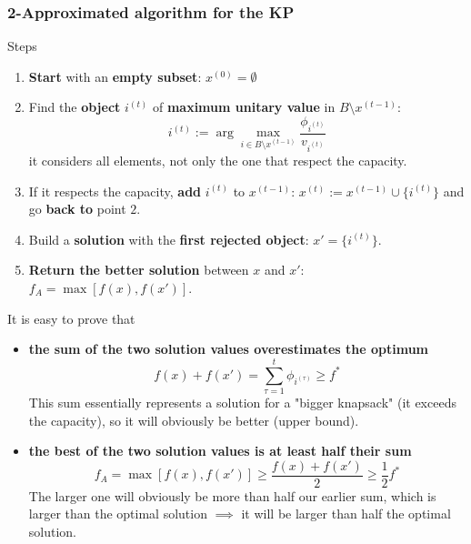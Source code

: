 \subsubsection{2-Approximated algorithm for the KP}
Steps
\begin{enumerate}
	\item \textbf{Start} with an \textbf{empty subset}: $x^{(0)} = \emptyset$
	
	\item Find the \textbf{object} $i^{(t)}$ of \textbf{maximum unitary value} in $B \setminus x^{(t−1)}$:
	$$ i^{(t)} := \arg \max_{i \in B \setminus x^{(t-1)}} \frac{\phi_{i^{(t)}}}{v_{i^{(t)}}}$$
	it considers all elements, not only the one that respect the capacity.\\
	
	\item If it respects the capacity, \textbf{add} $i^{(t)}$ to $x^{(t−1)}$: $x^{(t)} := x^{(t−1)} \cup \{i^{(t)}\}$ and go \textbf{back to} point $2$.\\
	
	\item Build a \textbf{solution} with the \textbf{first rejected object}: $x' = \{i^{(t)}\}$.\\
	
	\item \textbf{Return the better solution} between $x$ and $x'$: $f_A = \max \left[f (x), f (x')\right]$.\\
\end{enumerate}


It is easy to prove that
\begin{itemize}
	\item \textbf{the sum of the two solution values overestimates the optimum}
	$$ f(x) + f(x') = \sum_{\tau = 1}^{t} \phi_{i^{(\tau)}} \geq f^\ast $$
	This sum essentially represents a solution for a "bigger knapsack" (it exceeds the capacity), so it will obviously be better (upper bound).\\
	
	\item \textbf{the best of the two solution values is at least half their sum}
	$$ f_A = \max \left[ f(x), f(x')\right] \geq \frac{f(x) + f(x')}{2} \geq \frac{1}{2} f^\ast$$
	The larger one will obviously be more than half our earlier sum, which is larger than the optimal solution $\implies$ it will be larger than half the optimal solution.\\
\end{itemize}

